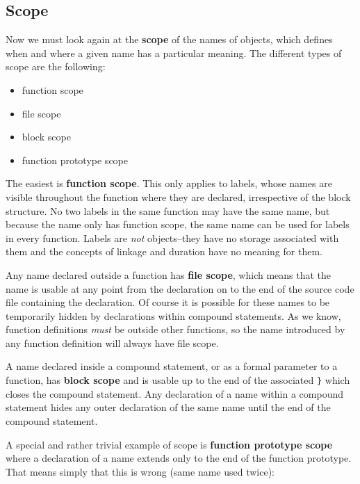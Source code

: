    

  

  \subsection{Scope}
   

   Now we must look again at the \textbf{scope} of the names of
    objects, which defines when and where a given name has a particular
    meaning. The different types of scope are the following:


   \begin{itemize}
    \item function scope
    \item file scope
    \item block scope
    \item function prototype scope
   \end{itemize}

   The easiest is \textbf{function scope}. This only applies to labels,
    whose names are visible throughout the function where they are declared,
    irrespective of the block structure. No two labels in the same function
    may have the same name, but because the name only has function scope,
    the same name can be used for labels in every function. Labels are
    \textit{not} objects--they have no storage associated with them and
    the concepts of linkage and duration have no meaning for them.


   Any name declared outside a function has \textbf{file scope}, which
    means that the name is usable at any point from the declaration on to
    the end of the source code file containing the declaration. Of course it
    is possible for these names to be temporarily hidden by declarations
    within compound statements. As we know, function definitions
    \textit{must} be outside other functions, so the name introduced by any
    function definition will always have file scope.


   A name declared inside a compound statement, or as a formal parameter
    to a function, has \textbf{block scope} and is usable up to the end of
    the associated \texttt{\}} which closes the compound statement. Any
    declaration of a name within a compound statement hides any outer
    declaration of the same name until the end of the compound
    statement.


   A special and rather trivial example of scope is \textbf{function
    prototype scope} where a declaration of a name extends only to the
    end of the function prototype. That means simply that this is wrong
    (same name used twice):



